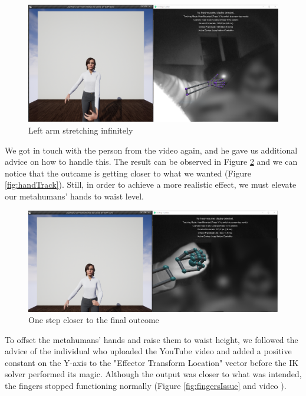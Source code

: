 \begin{figure}[!htb]
\includegraphics[width=\textwidth]{figures/handStretching.png}
\centering
\caption{Left arm stretching infinitely}
\label{fig:armsStretching}
\end{figure}

We got in touch with the person from the video again, and he gave us additional advice on how to handle this. The result can be observed in Figure \ref{fig:closeOutcome} and we can notice that the outcame is getting closer to what we wanted (Figure \ref{fig:handTrack}). Still, in order to achieve a more realistic effect, we must elevate our metahumans' hands to waist level.

\begin{figure}[!htb]
\includegraphics[width=\textwidth]{figures/handMinPosition.png}
\centering
\caption{One step closer to the final outcome}
\label{fig:closeOutcome}
\end{figure}

To offset the metahumans' hands and raise them to waist height, we followed the advice of the individual who uploaded the YouTube video and added a positive constant on the Y-axis to the "Effector Transform Location" vector before the IK solver performed its magic. Although the output was closer to what was intended, the fingers stopped functioning normally (Figure \ref{fig:fingersIssue} and video \cite{APT3}).

